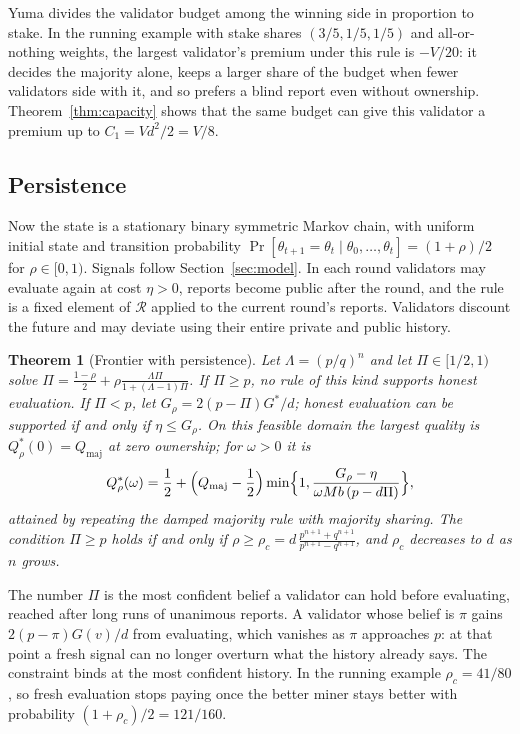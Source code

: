 \documentclass[sigconf,anonymous,review]{acmart}
\numberwithin{equation}{section}
\newtheorem{theorem}{Theorem}[section]
\newcommand{\Qmaj}{Q_{\mathrm{maj}}}
\newcommand{\Gs}{G^{*}}
\newcommand{\Rset}{\mathcal{R}}
\begin{document}
Yuma divides the validator budget among the winning side in proportion to
stake. In the running example with stake shares $(3/5,1/5,1/5)$ and all-or-nothing
weights, the largest validator's premium under this rule is $-V/20$: it decides
the majority alone, keeps a larger share of the budget when fewer validators
side with it, and so prefers a blind report even without ownership.
Theorem~\ref{thm:capacity} shows that the same budget can give this validator a
premium up to $C_1=Vd^2/2=V/8$.

\subsection{Persistence}

Now the state is a stationary binary symmetric Markov chain, with uniform
initial state and transition probability
$\Pr[\theta_{t+1}=\theta_t\mid\theta_0,\ldots,\theta_t]=(1+\rho)/2$
for $\rho\in[0,1)$. Signals follow Section~\ref{sec:model}. In each round validators may evaluate again
at cost $\eta>0$, reports become public after the round, and the rule is a
fixed element of $\Rset$ applied to the current round's reports. Validators
discount the future and may deviate using their entire private and public
history.

\begin{theorem}[Frontier with persistence]\label{thm:memory}
Let $\Lambda=(p/q)^n$ and let $\Pi\in[1/2,1)$ solve
$\Pi=\frac{1-\rho}2+\rho\frac{\Lambda\Pi}{1+(\Lambda-1)\Pi}$.
If $\Pi\ge p$, no rule of this kind supports honest evaluation. If $\Pi<p$, let
$G_\rho=2(p-\Pi)\Gs/d$; honest evaluation can be supported if and only if
$\eta\le G_\rho$. On this feasible domain the largest quality is
$Q^*_\rho(0)=\Qmaj$ at zero ownership; for $\omega>0$ it is
\[
Q^*_\rho(\omega)=\frac12+\Bigl(\Qmaj-\frac12\Bigr)\min\Bigl\{1,\frac{G_\rho-\eta}{\omega Mb\,(p-d\Pi)}\Bigr\},
\]
attained by repeating the damped majority rule with majority sharing. The
condition $\Pi\ge p$ holds if and only if
$\rho\ge\rho_c=d\,\frac{p^{n+1}+q^{n+1}}{p^{n+1}-q^{n+1}}$, and $\rho_c$
decreases to $d$ as $n$ grows.
\end{theorem}

The number $\Pi$ is the most confident belief a validator can hold before
evaluating, reached after long runs of unanimous reports. A validator whose
belief is $\pi$ gains $2(p-\pi)G(v)/d$ from evaluating, which vanishes as $\pi$
approaches $p$: at that point a fresh signal can no longer overturn what the
history already says. The constraint binds at the most confident history. In
the running example $\rho_c=41/80$, so fresh evaluation stops paying once the
better miner stays better with probability $(1+\rho_c)/2=121/160$.
\end{document}

